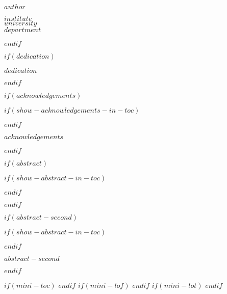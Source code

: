 \documentclass[a4paper, $if(page-layout)$$page-layout$$endif$]{templates/ociamthesis}
\begin{document}
\begin{romanpages}
\begin{titlepage}
\begin{center}
       {\huge $author$}
       
       \vfill
       
            
       \vspace{0.8cm}
     
            
       $institute$ \\
       $university$ \\
       $department$ 
            
   \end{center}
\end{titlepage}
$endif$

$if(dedication)$
\begin{dedication}
  $dedication$
\end{dedication}
$endif$

$if(acknowledgements)$

$if(show-acknowledgements-in-toc)$
{}
\renewcommand{\numberstyleacks}{plain}
\renewcommand{\numberstyleabstract}{plain}
$endif$

\begin{acknowledgements}
 	$acknowledgements$
\end{acknowledgements}

$endif$


$if(abstract)$

$if(show-abstract-in-toc)$
{}
\renewcommand{\numberstyleabstract}{plain}
$endif$

\renewcommand{\abstracttitle}{$abstract-heading$}
\begin{abstract}
	$abstract$
\end{abstract}

$endif$

$if(abstract-second)$

$if(show-abstract-in-toc)$
{}
\renewcommand{\numberstyleabstract}{plain}
$endif$

\renewcommand{\abstractsecondtitle}{$abstract-second-heading$}
\begin{abstractsecond}
	$abstract-second$
\end{abstractsecond}

$endif$

$if(mini-toc)$
  \dominitoc %
$endif$
$if(mini-lof)$
  \dominilof  %
$endif$
$if(mini-lot)$
  \dominilot  %
$endif$


\end{romanpages}
\end{document}
